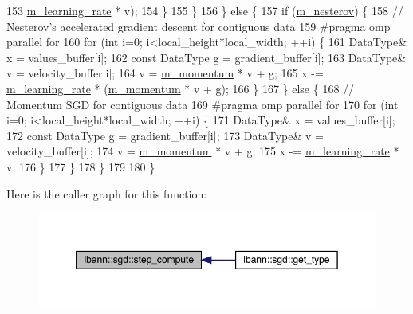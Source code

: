 \begin{DoxyCode}
153               \hyperlink{classlbann_1_1optimizer_ad393dcdcb82b44510c586ed5ec46d4dd}{m\_learning\_rate} * v);
154       \}
155     \}
156   \} \textcolor{keywordflow}{else} \{
157     \textcolor{keywordflow}{if} (\hyperlink{classlbann_1_1sgd_a82da488e5d1530f50f67cd4ea30909cb}{m\_nesterov}) \{
158       \textcolor{comment}{// Nesterov's accelerated gradient descent for contiguous data}
159 \textcolor{preprocessor}{      #pragma omp parallel for}
160       \textcolor{keywordflow}{for} (\textcolor{keywordtype}{int} i=0; i<local\_height*local\_width; ++i) \{
161         DataType& x = values\_buffer[i];
162         \textcolor{keyword}{const} DataType g = gradient\_buffer[i];
163         DataType& v = velocity\_buffer[i];
164         v = \hyperlink{classlbann_1_1sgd_a2e56d66d350debcf0d2c3ad76c214074}{m\_momentum} * v + g;
165         x -= \hyperlink{classlbann_1_1optimizer_ad393dcdcb82b44510c586ed5ec46d4dd}{m\_learning\_rate} * (\hyperlink{classlbann_1_1sgd_a2e56d66d350debcf0d2c3ad76c214074}{m\_momentum} * v + g);
166       \}
167     \} \textcolor{keywordflow}{else} \{
168       \textcolor{comment}{// Momentum SGD for contiguous data}
169 \textcolor{preprocessor}{#pragma omp parallel for}
170       \textcolor{keywordflow}{for} (\textcolor{keywordtype}{int} i=0; i<local\_height*local\_width; ++i) \{
171         DataType& x = values\_buffer[i];
172         \textcolor{keyword}{const} DataType g = gradient\_buffer[i];
173         DataType& v = velocity\_buffer[i];
174         v = \hyperlink{classlbann_1_1sgd_a2e56d66d350debcf0d2c3ad76c214074}{m\_momentum} * v + g;
175         x -= \hyperlink{classlbann_1_1optimizer_ad393dcdcb82b44510c586ed5ec46d4dd}{m\_learning\_rate} * v;
176       \}
177     \}
178   \}
179 
180 \}
\end{DoxyCode}
Here is the caller graph for this function\+:\nopagebreak
\begin{figure}[H]
\begin{center}
\leavevmode
\includegraphics[width=350pt]{classlbann_1_1sgd_a083a44b456939b58f531cea1fde2378b_icgraph}
\end{center}
\end{figure}
\mbox{\label{classlbann_1_1sgd_a3afe5aa1f1861c390472ff6f53093386}} 
